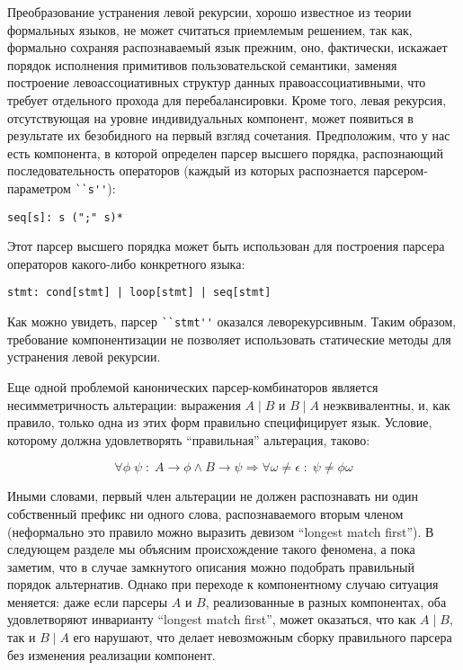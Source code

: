 \documentclass[conference]{IEEEtran}
\begin{document}
Преобразование устранения левой рекурсии, хорошо известное из теории формальных языков, не может считаться приемлемым решением, так как,
формально сохраняя распознаваемый язык прежним, оно, фактически, искажает порядок исполнения примитивов пользовательской семантики, заменяя
построение левоассоциативных структур данных правоассоциативными, что требует отдельного прохода для перебалансировки. Кроме того,
левая рекурсия, отсутствующая на уровне индивидуальных компонент, может появиться в результате их безобидного на первый взгляд сочетания.
Предположим, что у нас есть компонента, в которой определен парсер высшего порядка, распознающий последовательность операторов (каждый из которых
распознается парсером-параметром \lstinline|``s''|):

\begin{lstlisting}[basicstyle=\small]
  seq[s]: s (";" s)*
\end{lstlisting}

Этот парсер высшего порядка может быть использован для построения парсера операторов какого-либо конкретного языка:

\begin{lstlisting}[basicstyle=\small]
  stmt: cond[stmt] | loop[stmt] | seq[stmt]
\end{lstlisting}

Как можно увидеть, парсер \lstinline|``stmt''| оказался леворекурсивным. Таким образом, требование компонентизации не позволяет
использовать статические методы для устранения левой рекурсии.

Еще одной проблемой канонических парсер-комбинаторов является несимметричность альтерации: выражения $A \mid B$ и $B\mid A$
неэквивалентны, и, как правило, только одна из этих форм правильно специфицирует язык. Условие, которому должна удовлетворять
``правильная'' альтерация, таково:

\[
\forall\phi\;\psi\;:\; A\rightarrow\phi \wedge B\rightarrow\psi \Rightarrow \forall\omega\ne\epsilon\;:\;\psi\ne\phi\omega
\]

Иными словами, первый член альтерации не должен распознавать ни один собственный префикс ни одного слова, распознаваемого
вторым членом (неформально это правило можно выразить девизом ``longest match first''). В следующем разделе мы объясним происхождение такого феномена,
а пока заметим, что в случае замкнутого описания можно подобрать правильный порядок альтернатив. Однако при переходе к компонентному случаю
ситуация меняется: даже если парсеры $A$ и $B$, реализованные в разных компонентах, оба удовлетворяют инварианту ``longest match first'', может оказаться,
что как $A\mid B$, так и $B\mid A$ его нарушают, что делает невозможным сборку правильного парсера без изменения реализации компонент.
\end{document}
